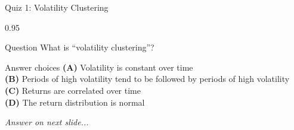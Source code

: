 \documentclass[9pt, aspectratio=169, t]{beamer}
\begin{document}
\begin{frame}{Quiz 1: Volatility Clustering}
    \begin{cminipage}{0.95\textwidth}
    \begin{alertblock}{Question}
        What is ``volatility clustering''?
    \end{alertblock}

    \vspace{0.4cm}

    \begin{block}{Answer choices}
        \textcolor{MainBlue}{\textbf{(A)}} Volatility is constant over time\\[3pt]
        \textcolor{MainBlue}{\textbf{(B)}} Periods of high volatility tend to be followed by periods of high volatility\\[3pt]
        \textcolor{MainBlue}{\textbf{(C)}} Returns are correlated over time\\[3pt]
        \textcolor{MainBlue}{\textbf{(D)}} The return distribution is normal
    \end{block}

    \vspace{0.5cm}

    \begin{center}
        \textit{Answer on next slide...}
    \end{center}
    \end{cminipage}
\end{frame}
\end{document}
